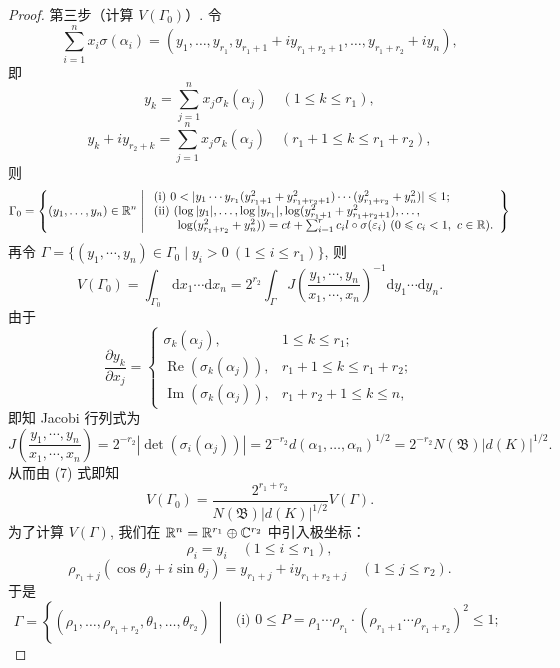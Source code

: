\begin{proof}
第三步（计算 $V(\Gamma_0)$）. 令
\[
  \sum_{i=1}^{n}x_i\sigma(\alpha_i)=(y_1,\dots,y_{r_1},y_{r_1+1}+iy_{r_1+r_2+1},\dots,y_{r_1+r_2}+iy_n),
\]
即
\[
  y_k=\sum_{j=1}^{n}x_j\sigma_k(\alpha_j)\quad(1\leqslant k\leqslant r_1),
\]
\[
  y_k+iy_{r_2+k}=\sum_{j=1}^{n}x_j\sigma_k(\alpha_j)\quad(r_1+1\leqslant k\leqslant r_1+r_2),
\]
则
\[
  \Gamma_0=\left\{(y_1,\dots,y_n)\in\R^n\;\middle|\;
  \begin{array}{l}
    \text{(i) } 0<|y_1\cdots y_{r_1}(y_{r_1+1}^2+y_{r_1+r_2+1}^2)\cdots(y_{r_1+r_2}^2+y_n^2)|\leqslant 1;\\
    \text{(ii) } (\log|y_1|,\dots,\log|y_{r_1}|,\log(y_{r_1+1}^2+y_{r_1+r_2+1}^2),\dots,\\
    \qquad\log(y_{r_1+r_2}^2+y_n^2))=ct+\sum_{i=1}^{r}c_i l\circ\sigma(\varepsilon_i)\ (0\leqslant c_i<1,\ c\in\R).
  \end{array}\right\}
\]
再令 $\Gamma=\{(y_1,\cdots,y_n)\in\Gamma_0\mid y_i>0\ (1\leqslant i\leqslant r_1)\}$, 则
\begin{equation}\tag{7}
  V(\Gamma_0)=\int_{\Gamma_0}\mathrm{d}x_1\cdots\mathrm{d}x_n
  =2^{r_2}\int_{\Gamma}J\left(\frac{y_1,\cdots,y_n}{x_1,\cdots,x_n}\right)^{-1}\mathrm{d}y_1\cdots\mathrm{d}y_n.
\end{equation}
由于
\[
  \frac{\partial y_k}{\partial x_j}=\begin{cases}
    \sigma_k(\alpha_j), & 1\leqslant k\leqslant r_1;\\
    \operatorname{Re}(\sigma_k(\alpha_j)), & r_1+1\leqslant k\leqslant r_1+r_2;\\
    \operatorname{Im}(\sigma_k(\alpha_j)), & r_1+r_2+1\leqslant k\leqslant n,
  \end{cases}
\]
即知 Jacobi 行列式为
\[
  J\left(\frac{y_1,\cdots,y_n}{x_1,\cdots,x_n}\right)
  =2^{-r_2}|\det(\sigma_i(\alpha_j))|=2^{-r_2}d(\alpha_1,\dots,\alpha_n)^{1/2}
  =2^{-r_2}N(\mathfrak{B})|d(K)|^{1/2}.
\]
从而由 (7) 式即知
\begin{equation}\tag{8}
  V(\Gamma_0)=\frac{2^{r_1+r_2}}{N(\mathfrak{B})|d(K)|^{1/2}}V(\Gamma).
\end{equation}
为了计算 $V(\Gamma)$, 我们在 $\mathbb{R}^n=\mathbb{R}^{r_1}\oplus\mathbb{C}^{r_2}$ 中引入极坐标：
\[
  \rho_i=y_i\quad(1\leqslant i\leqslant r_1),
\]
\[
  \rho_{r_1+j}(\cos\theta_j+i\sin\theta_j)=y_{r_1+j}+iy_{r_1+r_2+j}\quad(1\leqslant j\leqslant r_2).
\]
于是
\[
  \Gamma=\left\{(\rho_1,\dots,\rho_{r_1+r_2},\theta_1,\dots,\theta_{r_2})\;\middle|\;
  \begin{array}{l}
    \text{(i) } 0\leqslant P=\rho_1\cdots\rho_{r_1}\cdot(\rho_{r_1+1}\cdots\rho_{r_1+r_2})^2\leqslant 1;\\

\end{array}\]
\end{proof}
